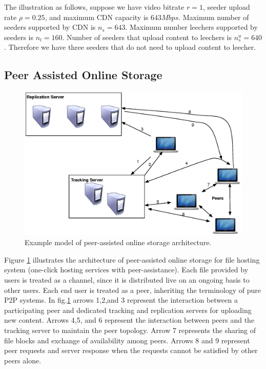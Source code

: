 \documentclass[conference]{IEEEtran}
\begin{document}
The illustration as follows, suppose we have video bitrate $r=1$, seeder upload rate $\rho=0.25$, and maximum CDN capacity is $643Mbps$. 
Maximum number of seeders supported by CDN is $n_s=643$.
Maximum number leechers supported by seeders is $n_l=160$.  
Number of seeders that upload content to leechers is $n_{s}^{u}=640$.  
Therefore we have three seeders that do not need to upload content to leecher. 

\subsection{Peer Assisted Online Storage}

\begin{figure}[thb]
\begin{center}
\includegraphics[scale=0.4]{graphs/fs2you-arch.eps}
\end{center}
\caption{Example model of peer-assisted online storage architecture.}
\label{fig:fs2you}
\end{figure} 

Figure \ref{fig:fs2you} illustrates the architecture of peer-assisted online storage for file hosting system (one-click hosting services with peer-assistance).
Each file provided by users is treated as a channel, since it is distributed live on an ongoing basis to other users. 
Each end user is treated as a peer, inheriting the terminology of pure P2P systems.
In fig.\ref{fig:fs2you} arrows 1,2,and 3 represent the interaction between a participating peer and dedicated tracking and replication servers for uploading new content.
Arrows 4,5, and 6 represent the interaction between peers and the tracking server to maintain the peer topology. 
Arrow 7 represents the sharing of file blocks and exchange of availability among peers. 
Arrows 8 and 9 represent peer requests and server response when the requests cannot be satisfied by other peers alone. 
\end{document}
